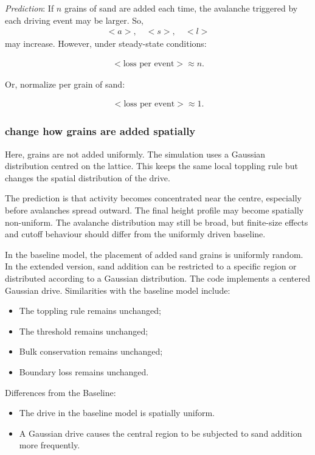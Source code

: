 \documentclass{article}
\begin{document}
\textit{Prediction}: If $n$ grains of sand are added each time, the avalanche triggered by each driving event may be larger. So, 
\begin{align}
    <a>, \quad <s>, \quad <l>
\end{align}
may increase. However, under steady-state conditions:

\begin{align}
    <\mbox{loss per event}> \approx n.
\end{align}

Or, normalize per grain of sand:

\begin{align}
    <\mbox{loss per event}> \approx 1.
\end{align}

\subsubsection{change how grains are added spatially}
Here, grains are not added uniformly. The simulation uses a Gaussian distribution centred on the lattice. This keeps the same local toppling rule but changes the spatial distribution of the drive.

The prediction is that activity becomes concentrated near the centre, especially before avalanches spread outward. The final height profile may become spatially non-uniform. The avalanche distribution may still be broad, but finite-size effects and cutoff behaviour should differ from the uniformly driven baseline.

In the baseline model, the placement of added sand grains is uniformly random. In the extended version, sand addition can be restricted to a specific region or distributed according to a Gaussian distribution. The code implements a centered Gaussian drive. Similarities with the baseline model include:

\begin{itemize}
    \item The toppling rule remains unchanged;
    \item The threshold remains unchanged;
    \item Bulk conservation remains unchanged;
    \item Boundary loss remains unchanged.
\end{itemize}

\clearpage

Differences from the Baseline:

\begin{itemize}
    \item The drive in the baseline model is spatially uniform.
    
    \item A Gaussian drive causes the central region to be subjected to sand addition more frequently.
\end{itemize}
\end{document}
